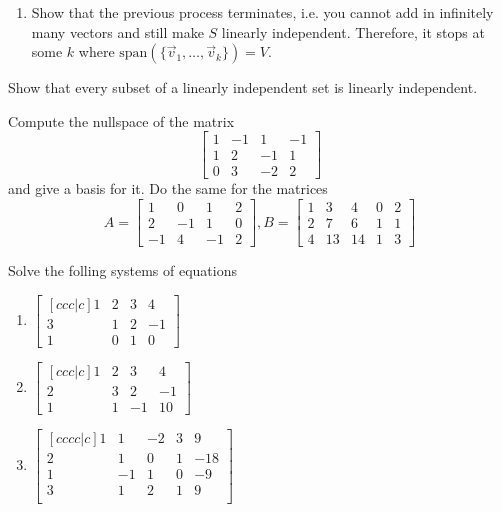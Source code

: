 \begin{exerciselist}
\begin{enumerate}[label=(\alph*)]
		\item Show that the previous process terminates, i.e. you cannot add in infinitely many vectors and still make $S$ linearly independent. Therefore, it stops at some $k$ where $\textrm{span}(\{\vec{v}_1,\ldots,\vec{v}_k\})=V$.
	\end{enumerate}
	\item Show that every subset of a linearly independent set is linearly independent.
	\item Compute the nullspace of the matrix \[
		\begin{bmatrix}
			1&-1&1&-1\\
			1& 2 &-1& 1\\
			0 & 3 & -2 & 2
		\end{bmatrix}
	\]
	and give a basis for it. Do the same for the matrices \[
	A=\begin{bmatrix}
		1&0&1&2\\
		2&-1 & 1 & 0\\
		-1 & 4 & -1 & 2
	\end{bmatrix}, B=\begin{bmatrix}
		1& 3&4&0&2\\
		2&7&6&1&1\\
		4&13&14&1&3
	\end{bmatrix}
	\]
	\item Solve the folling systems of equations \begin{enumerate}[label=(\alph*)]
		\item $\begin{bmatrix}[ccc|c]
			1&2&3&4\\
			3&1&2&-1\\
			1&0&1&0
		\end{bmatrix} $
		\item $\begin{bmatrix}[ccc|c]
			1&2&3&4\\
			2&3&2&-1\\
			1&1&-1&10
		\end{bmatrix}$
		\item $\begin{bmatrix}[cccc|c]
			1&1&-2&3&9\\
			2&1&0&1&-18\\
			1&-1&1&0&-9\\
			3&1&2&1&9\\
		\end{bmatrix}$
	\end{enumerate}
	

\end{exerciselist}
